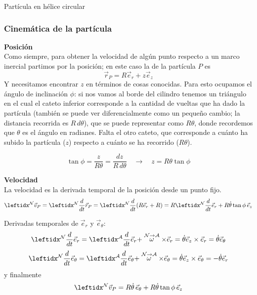 \begin{solucion}{Partícula en hélice circular}
\subsubsection*{Cinemática de la partícula}
\textbf{Posición}\\
Como siempre, para obtener la velocidad de algún punto respecto a un marco inercial partimos por la posición; en este caso la de la partícula $P$ es
$$\vec{r}_P=R\vec{e}_r+z\vec{e}_z$$
Y necesitamos encontrar $z$ en términos de cosas conocidas. Para esto ocupamos el ángulo de inclinación $\phi$: si nos vamos al borde del cilindro tenemos un triángulo en el cual el cateto inferior corresponde a la cantidad de vueltas que ha dado la partícula (también se puede ver diferencialmente como un pequeño cambio; la distancia recorrida es $R\,d\theta$), que se puede representar como $R\theta$, donde recordemos que $\theta$ es el ángulo en radianes. Falta el otro cateto, que corresponde a cuánto ha subido la partícula ($z$) respecto a cuánto se ha recorrido ($R\theta$).
\begin{center}
\end{center}
$$\tan\phi=\dfrac{z}{R\theta}=\dfrac{dz}{R\,d\theta}\quad\longrightarrow\quad z=R\theta\tan\phi$$

\textbf{Velocidad}\\
La velocidad es la derivada temporal de la posición desde un punto fijo.
$$\marc{\vec{v}_P}{N}=\der{\vec{r}_{P}}{N}=\der{(R\vec{e}_r+R)}{N}{}= R\der{\vec{e}_r}{N}{}+R\dot\theta\tan\phi\,\vec{e}_z$$


Derivadas temporales de $\vec{e}_r$ y $\vec{e}_\theta$:
$$\transport{\vec{e}_r}{N}{A}=\dot\theta\vec{e}_z\times\vec{e}_r=\dot\theta\vec{e}_\theta$$
$$\transport{\vec{e}_\theta}{N}{A}=\dot\theta\vec{e}_z\times\vec{e}_\theta=-\dot\theta\vec{e}_r$$
y finalmente
$$\marc{\vec{v}_P}{N}=R\dot\theta\,\vec{e}_\theta+R\dot\theta\tan\phi\,\vec{e}_z$$


\end{solucion}
